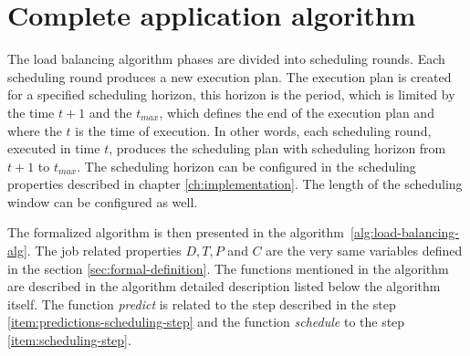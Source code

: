 \section{Complete application algorithm}\label{sec:olb-algorithm}

The load balancing algorithm phases are divided into scheduling rounds.
Each scheduling round produces a new execution plan.
The execution plan is created for a specified scheduling horizon,
this horizon is the period,
which is limited by the time $t+1$ and the $t_{max}$, 
which defines the end of the execution plan
and where the $t$ is the time of execution.
In other words,
each scheduling round, executed in time $t$,
produces the scheduling plan with scheduling horizon from $t+1$ to $t_{max}$.
The scheduling horizon can be configured in the scheduling properties described in chapter \ref{ch:implementation}.
The length of the scheduling window can be configured as well. 

The formalized algorithm is then presented in the algorithm~\ref{alg:load-balancing-alg}.
The job related properties $D,T,P$ and $C$ are the very same variables defined in the section \ref{sec:formal-definition}.
The functions mentioned in the algorithm are described in the algorithm detailed description listed below the algorithm itself.
The function \textit{predict} is related to the step described in the step \ref{item:predictions-scheduling-step}
and the function \textit{schedule} to the step \ref{item:scheduling-step}.

